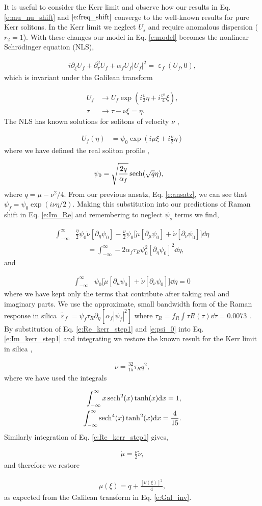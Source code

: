 \documentclass[reprint,
 amsmath,amssymb,
 pra,
]{revtex4-1}
\newcommand{\eq}[1]{
\begin{equation}\begin{aligned}
#1
\end{aligned}\end{equation}}
\DeclareMathOperator{\eps}{\varepsilon}
\begin{document}
It is useful to consider the Kerr limit and observe how our results in Eq. \eqref{e:mu_nu_shift} and $\eqref{e:freq_shift}$ converge to the well-known results for pure Kerr solitons. In the Kerr limit we neglect $U_s$ and require anomalous dispersion ( $r_2=1$). With these changes our model in Eq. \eqref{e:model} becomes the nonlinear Schr{\"o}dinger equation (NLS),
\eq{
i\partial_\xi U_f + \partial_\tau^2 U_f +  \alpha_f U_f |U_f|^2 = \eps_f(U_f,0),
}
which is invariant under the Galilean transform \cite{Kivshar2003ChapterSolitons}
\eq{\label{e:Gal_inv}
U_f &\rightarrow U_f \exp(i\frac{v}{2}\eta + i\frac{v^2}{4}\xi),\\
\tau &\rightarrow \tau - \nu \xi = \eta.
}
The NLS has known solutions for solitons of velocity $\nu$ \cite{Kivshar2003ChapterSolitons},
\eq{
U_f(\eta) &= \psi_0 \exp(i\mu\xi + i \frac{\nu}{2}\eta)
}
where we have defined the real soliton profile \cite{Agrawal2013NonlinearOptics},
\eq{\label{e:psi_0}
\psi_0 &= \sqrt{\frac{2q}{\alpha_f}}\sech(\sqrt{q}\eta),
}
where $q = \mu - \nu^2/4$. From our previous ansatz, Eq. \eqref{e:ansatz}, we can see that $\psi_f = \psi_0 \exp(i\nu\eta/2)$. Making this substitution into our predictions of Raman shift in Eq. \eqref{e:Im_Re} and remembering to neglect $\psi_s$ terms we find,
\eq{\label{e:Im_kerr_step1}
 \int_{-\infty}^{\infty}& \frac{\eta}{2}   \psi_0 \dot{\nu}[\partial_\eta \psi_0]  - \frac{\nu}{2}\psi_0\big[ \dot{\mu} [\partial_\mu \psi_0] + \dot{\nu} [\partial_\nu \psi_0] \big]   \dd \eta \\& \,\,\,\,\,\,\,\,\,\, = \int_{-\infty}^{\infty} -2\alpha_f\tau_R \psi_0^2 [\partial_\eta\psi_0]^2 \dd \eta, 
 }
 and
 \eq{\label{e:Re_kerr_step1}
 \int_{-\infty}^{\infty}& \psi_0\big[\dot{\mu}[\partial_\mu \psi_0 ] + \dot{\nu} [\partial_\nu \psi_0] \big] \dd \eta = 0
}
where we have kept only the terms that contribute after taking real and imaginary parts. We use the approximate, small bandwidth form of the Raman response in silica $\tilde{\eps}_f = \psi_f \tau_R \partial_\eta[\alpha_f |\psi_f|^2]$ where $\tau_R = f_R \int \tau R(\tau) \dd \tau = 0.0073$ \cite{Skryabin2005TheoryFibers}. By substitution of Eq. \eqref{e:Re_kerr_step1} and \eqref{e:psi_0} into Eq. \eqref{e:Im_kerr_step1} and integrating we restore the known result for the Kerr limit in silica \cite{Agrawal2013NonlinearOptics, Skryabin2010TheoryWaves},
\eq{\label{e:nu_dot_kerr}
\dot{\nu} = \frac{32}{15} \tau_R q^2,
}
where we have used the integrals
\eq{
\int_{-\infty}^{\infty} x \sech^2(x) \tanh(x) \dd x  = 1,\\
\int_{-\infty}^{\infty} \sech^4(x) \tanh^2(x) \dd x  = \frac{4}{15}.
}
Similarly integration of Eq. \eqref{e:Re_kerr_step1} gives,
\eq{
\dot{\mu} = \frac{\nu}{2} \dot{\nu},
}
and therefore we restore
\eq{\label{e:mu_xi_kerr}
\mu(\xi) = q + \frac{[\nu(\xi)]^2}{4},
}
as expected from the Galilean transform in Eq. \eqref{e:Gal_inv}.
\end{document}
